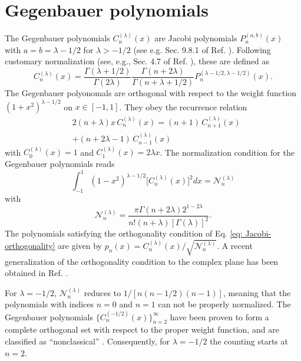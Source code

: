 \documentclass[aps, notitlepage, floatfix, pre, twocolumn]{revtex4-2}
\begin{document}
\section{Gegenbauer polynomials} \label{app: Gegenbauer}
The Gegenbauer polynomials $C_n^{(\lambda)}(x)$ are Jacobi polynomials $P_n^{(a, b)}(x)$ with $a = b = \lambda - 1/2$ for $\lambda > -1/2$ (see e.g. Sec. 9.8.1 of Ref. \cite{Koekoek10}). Following customary normalization (see, e.g., Sec. 4.7 of Ref. \cite{Szego75}), these are defined as
\begin{equation}
C_n^{(\lambda)}(x) = \frac{\Gamma(\lambda + 1/2)}{\Gamma(2 \lambda)} \frac{\Gamma(n + 2 \lambda)}{\Gamma(n + \lambda + 1/2)} P_n^{(\lambda - 1/2, \lambda - 1/2)}(x).
\end{equation}
The Gegenbauer polyonomals are orthogonal with respect to the weight function $(1+x^2)^{\lambda - 1/2}$ on $x \in [-1,1]$. They obey the recurrence relation
\begin{equation}
\begin{split}
& 2 (n+\lambda) x \, C_n^{(\lambda)}(x) = (n+1) \, C_{n+1}^{(\lambda)}(x) \\
& + (n + 2 \lambda - 1) \, C_{n-1}^{(\lambda)}(x) 
\end{split}
\end{equation}
with $C_0^{(\lambda)}(x) = 1$ and $C_1^{(\lambda)}(x) = 2 \lambda x$. The normalization condition for the Gegenbauer polynomials reads
\begin{equation}
\int_{-1}^1 (1 - x^2)^{\lambda - 1/2} \big[ C_n^{(\lambda)}(x) \big]^2 dx = \mathcal{N}_n^{(\lambda)}
\end{equation}
with
\begin{equation}
 \mathcal{N}_n^{(\lambda)} = \frac{\pi \Gamma(n + 2 \lambda) 2^{1 - 2 \lambda}}{n! (n + \lambda) [ \Gamma(\lambda)]^2}.
\end{equation}
The polynomials satisfying the orthogonality condition of Eq. \eqref{eq: Jacobi-orthogonality} are given by $p_n(x) = C_n^{(\lambda)} (x) / \sqrt{ \mathcal{N}_n^{(\lambda)}}$. A recent generalization of the orthogonality condition to the complex plane has been obtained in Ref. \cite{Akemann21}.

For $\lambda = -1/2$, $ \mathcal{N}_n^{(\lambda)}$ reduces to $1 / [n (n-1/2)(n-1)]$, meaning that the polynomials with indices $n = 0$ and $n = 1$ can not be properly normalized. The Gegenbauer polynomials $\{ C_n^{(-1/2)}(x) \}_{n=2}^\infty$ have been proven to form a complete orthogonal set with respect to the proper weight function, and are classified as ``nonclassical'' \cite{Bruder14}. Consequently, for $\lambda = -1/2$ the counting starts at $n = 2$.



\nocite{apsrev42Control}

\end{document}
